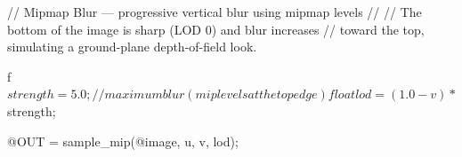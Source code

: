 // Mipmap Blur — progressive vertical blur using mipmap levels
//
// The bottom of the image is sharp (LOD 0) and blur increases
// toward the top, simulating a ground-plane depth-of-field look.

f$strength = 5.0;  // maximum blur (mip levels at the top edge)

float lod = (1.0 - v) * $strength;

@OUT = sample_mip(@image, u, v, lod);
